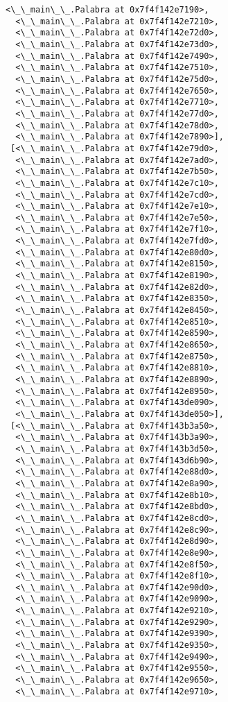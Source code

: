 \documentclass[12pt,a4paper,table]{article}
\begin{document}
\begin{tcolorbox}[breakable, size=fbox, boxrule=.5pt, pad at break*=1mm, opacityfill=0]
\begin{Verbatim}[commandchars=\\\{\}]
  <\_\_main\_\_.Palabra at 0x7f4f142e7190>,
  <\_\_main\_\_.Palabra at 0x7f4f142e7210>,
  <\_\_main\_\_.Palabra at 0x7f4f142e72d0>,
  <\_\_main\_\_.Palabra at 0x7f4f142e73d0>,
  <\_\_main\_\_.Palabra at 0x7f4f142e7490>,
  <\_\_main\_\_.Palabra at 0x7f4f142e7510>,
  <\_\_main\_\_.Palabra at 0x7f4f142e75d0>,
  <\_\_main\_\_.Palabra at 0x7f4f142e7650>,
  <\_\_main\_\_.Palabra at 0x7f4f142e7710>,
  <\_\_main\_\_.Palabra at 0x7f4f142e77d0>,
  <\_\_main\_\_.Palabra at 0x7f4f142e78d0>,
  <\_\_main\_\_.Palabra at 0x7f4f142e7890>],
 [<\_\_main\_\_.Palabra at 0x7f4f142e79d0>,
  <\_\_main\_\_.Palabra at 0x7f4f142e7ad0>,
  <\_\_main\_\_.Palabra at 0x7f4f142e7b50>,
  <\_\_main\_\_.Palabra at 0x7f4f142e7c10>,
  <\_\_main\_\_.Palabra at 0x7f4f142e7cd0>,
  <\_\_main\_\_.Palabra at 0x7f4f142e7e10>,
  <\_\_main\_\_.Palabra at 0x7f4f142e7e50>,
  <\_\_main\_\_.Palabra at 0x7f4f142e7f10>,
  <\_\_main\_\_.Palabra at 0x7f4f142e7fd0>,
  <\_\_main\_\_.Palabra at 0x7f4f142e80d0>,
  <\_\_main\_\_.Palabra at 0x7f4f142e8150>,
  <\_\_main\_\_.Palabra at 0x7f4f142e8190>,
  <\_\_main\_\_.Palabra at 0x7f4f142e82d0>,
  <\_\_main\_\_.Palabra at 0x7f4f142e8350>,
  <\_\_main\_\_.Palabra at 0x7f4f142e8450>,
  <\_\_main\_\_.Palabra at 0x7f4f142e8510>,
  <\_\_main\_\_.Palabra at 0x7f4f142e8590>,
  <\_\_main\_\_.Palabra at 0x7f4f142e8650>,
  <\_\_main\_\_.Palabra at 0x7f4f142e8750>,
  <\_\_main\_\_.Palabra at 0x7f4f142e8810>,
  <\_\_main\_\_.Palabra at 0x7f4f142e8890>,
  <\_\_main\_\_.Palabra at 0x7f4f142e8950>,
  <\_\_main\_\_.Palabra at 0x7f4f143de090>,
  <\_\_main\_\_.Palabra at 0x7f4f143de050>],
 [<\_\_main\_\_.Palabra at 0x7f4f143b3a50>,
  <\_\_main\_\_.Palabra at 0x7f4f143b3a90>,
  <\_\_main\_\_.Palabra at 0x7f4f143b3d50>,
  <\_\_main\_\_.Palabra at 0x7f4f143d6b90>,
  <\_\_main\_\_.Palabra at 0x7f4f142e88d0>,
  <\_\_main\_\_.Palabra at 0x7f4f142e8a90>,
  <\_\_main\_\_.Palabra at 0x7f4f142e8b10>,
  <\_\_main\_\_.Palabra at 0x7f4f142e8bd0>,
  <\_\_main\_\_.Palabra at 0x7f4f142e8cd0>,
  <\_\_main\_\_.Palabra at 0x7f4f142e8c90>,
  <\_\_main\_\_.Palabra at 0x7f4f142e8d90>,
  <\_\_main\_\_.Palabra at 0x7f4f142e8e90>,
  <\_\_main\_\_.Palabra at 0x7f4f142e8f50>,
  <\_\_main\_\_.Palabra at 0x7f4f142e8f10>,
  <\_\_main\_\_.Palabra at 0x7f4f142e90d0>,
  <\_\_main\_\_.Palabra at 0x7f4f142e9090>,
  <\_\_main\_\_.Palabra at 0x7f4f142e9210>,
  <\_\_main\_\_.Palabra at 0x7f4f142e9290>,
  <\_\_main\_\_.Palabra at 0x7f4f142e9390>,
  <\_\_main\_\_.Palabra at 0x7f4f142e9350>,
  <\_\_main\_\_.Palabra at 0x7f4f142e9490>,
  <\_\_main\_\_.Palabra at 0x7f4f142e9550>,
  <\_\_main\_\_.Palabra at 0x7f4f142e9650>,
  <\_\_main\_\_.Palabra at 0x7f4f142e9710>,

\end{Verbatim}
\end{tcolorbox}
\end{document}
